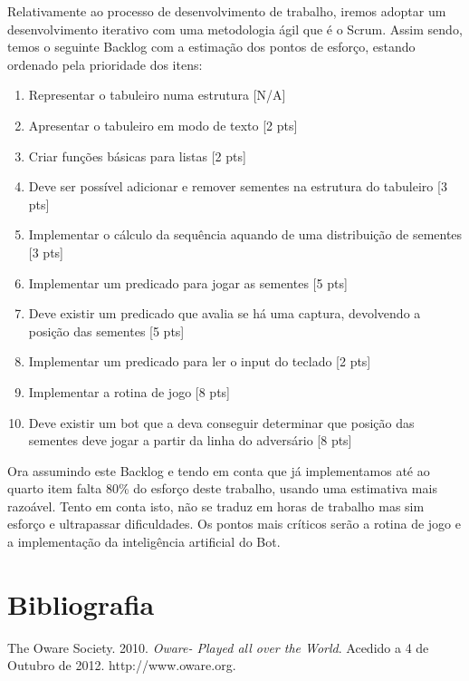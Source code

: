\documentclass[15pt,a4paper]{article}
\begin{document}
\indent Relativamente ao processo de desenvolvimento de trabalho, iremos adoptar um desenvolvimento iterativo com uma metodologia ágil que é o Scrum. Assim sendo, temos o seguinte Backlog com a estimação dos pontos de esforço, estando ordenado pela prioridade dos itens:

\begin{enumerate}
  \item Representar o tabuleiro numa estrutura [N/A]
  \item Apresentar o tabuleiro em modo de texto [2 pts]
  \item Criar funções básicas para listas [2 pts]
  \item Deve ser possível adicionar e remover sementes na estrutura do tabuleiro [3 pts]
  \item Implementar o cálculo da sequência aquando de uma distribuição de sementes [3 pts]
  \item Implementar um predicado para jogar as sementes [5 pts]
  \item Deve existir um predicado que avalia se há uma captura, devolvendo a posição das sementes [5 pts]
  \item Implementar um predicado para ler o input do teclado [2 pts]
  \item Implementar a rotina de jogo [8 pts]
  \item Deve existir um bot que a deva conseguir determinar que posição das sementes deve jogar a partir da linha do adversário [8 pts]
\end{enumerate}

Ora assumindo este Backlog e tendo em conta que já implementamos até ao quarto item falta 80\% do esforço deste trabalho, usando uma estimativa mais razoável. Tento em conta isto, não se traduz em horas de trabalho mas sim esforço e ultrapassar dificuldades. Os pontos mais críticos serão a rotina de jogo e a implementação da inteligência artificial do Bot.
\newpage
\section{Bibliografia}
\begin{thebibliography}{9}

  The Oware Society.
  2010.
  \emph{ Oware- Played all over the World}.
  Acedido a 4 de Outubro de 2012.
  http://www.oware.org.

\end{thebibliography}

\newpage
\appendix
\end{document}
